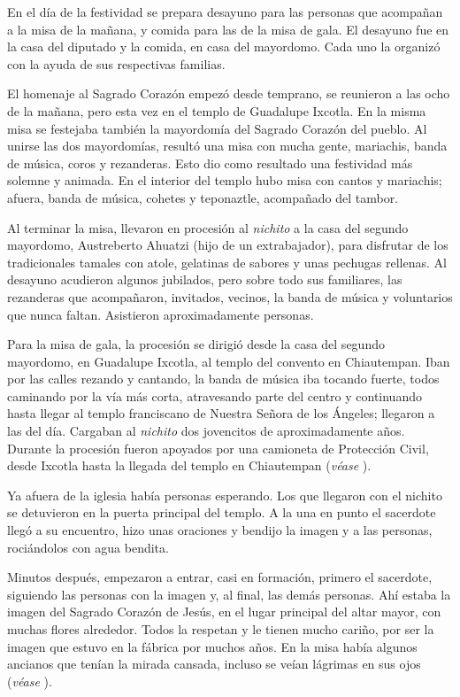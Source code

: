 \documentclass[14pt,letterpaper,twoside]{extbook} %
\begin{document}
En el día de la festividad se prepara desayuno para las personas que acompañan a la misa de la mañana, y comida para las de la misa de gala. El desayuno fue en la casa del diputado y la comida, en casa del mayordomo. Cada uno la organizó con la ayuda de sus respectivas familias.

El homenaje al Sagrado Corazón empezó desde temprano, se reunieron a las ocho de la mañana, pero esta vez en el templo de Guadalupe Ixcotla. En la misma misa se festejaba también la mayordomía del Sagrado Corazón del pueblo. Al unirse las dos mayordomías, resultó una misa con mucha gente, mariachis, banda de música, coros y rezanderas. Esto dio como resultado una festividad más solemne y animada. En el interior del templo hubo misa con cantos y mariachis; afuera, banda de música, cohetes y teponaztle, acompañado del tambor.

Al terminar la misa, llevaron en procesión al \textit{nichito} a la casa del segundo mayordomo, Austreberto Ahuatzi (hijo de un extrabajador), para disfrutar de los tradicionales tamales con atole, gelatinas de sabores y unas pechugas rellenas. Al desayuno acudieron algunos jubilados, pero sobre todo sus familiares, las rezanderas que acompañaron, invitados, vecinos, la banda de música y voluntarios que nunca faltan. Asistieron aproximadamente  personas.

Para la misa de gala, la procesión se dirigió desde la casa del segundo mayordomo, en Guadalupe Ixcotla, al templo del convento en Chiautempan. Iban por las calles rezando y cantando, la banda de música iba tocando fuerte, todos caminando por la vía más corta, atravesando parte del centro y continuando hasta llegar al templo franciscano de Nuestra Señora de los Ángeles; llegaron a las  del día. Cargaban al \textit{nichito} dos jovencitos de aproximadamente  años. Durante la procesión fueron apoyados por una camioneta de Protección Civil, desde Ixcotla hasta la llegada del templo en Chiautempan (\emph{véase} ).

Ya afuera de la iglesia había personas esperando. Los que llegaron con el nichito se detuvieron en la puerta principal del templo. A la una en punto el sacerdote llegó a su encuentro, hizo unas oraciones y bendijo la imagen y a las personas, rociándolos con agua bendita.

Minutos después, empezaron a entrar, casi en formación, primero el sacerdote, siguiendo las personas con la imagen y, al final, las demás personas. Ahí estaba la imagen del Sagrado Corazón de Jesús, en el lugar principal del altar mayor, con muchas flores alrededor. Todos la respetan y le tienen mucho cariño, por ser la imagen que estuvo en la fábrica por muchos años. En la misa había algunos ancianos que tenían la mirada cansada, incluso se veían lágrimas en sus ojos (\emph{véase} ).
\end{document}

